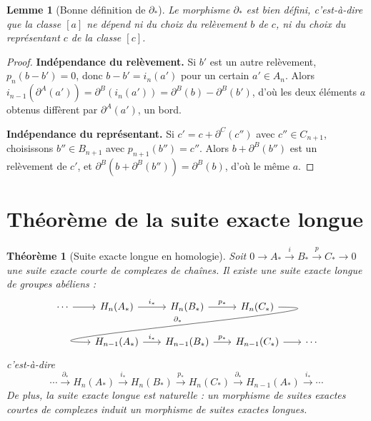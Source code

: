\documentclass[12pt,a4paper,openany]{book}
\theoremstyle{definition}
\theoremstyle{plain}
\newtheorem{theoreme}[definition]{Théorème}
\newtheorem{lemme}[definition]{Lemme}
\theoremstyle{remark}
\begin{document}
\begin{lemme}[Bonne définition de $\partial_*$]\label{lem:connexion-bien-defini}
Le morphisme $\partial_*$ est bien défini, c'est-à-dire que la classe $[a]$ ne dépend ni du
choix du relèvement $b$ de $c$, ni du choix du représentant $c$ de la classe $[c]$.
\end{lemme}

\begin{proof}
\textbf{Indépendance du relèvement.} Si $b'$ est un autre relèvement, $p_n(b - b') = 0$,
donc $b - b' = i_n(a')$ pour un certain $a' \in A_n$. Alors
$i_{n-1}(\partial^A(a')) = \partial^B(i_n(a')) = \partial^B(b) - \partial^B(b')$, d'où
les deux éléments $a$ obtenus diffèrent par $\partial^A(a')$, un bord.

\textbf{Indépendance du représentant.} Si $c' = c + \partial^C(c'')$ avec $c'' \in C_{n+1}$,
choisissons $b'' \in B_{n+1}$ avec $p_{n+1}(b'') = c''$. Alors $b + \partial^B(b'')$ est un
relèvement de $c'$, et $\partial^B(b + \partial^B(b'')) = \partial^B(b)$, d'où le même $a$.
\end{proof}

\section{Théorème de la suite exacte longue}\label{sec:sel-homologie}

\begin{theoreme}[Suite exacte longue en homologie]\label{thm:suite-exacte-longue}
Soit $0 \to A_* \xrightarrow{i} B_* \xrightarrow{p} C_* \to 0$ une suite exacte courte de
complexes de chaînes. Il existe une suite exacte longue de groupes abéliens :
\[
\begin{tikzcd}[column sep=1.8em]
  \cdots \ar[r] & H_n(A_*) \ar[r, "i_*"] & H_n(B_*) \ar[r, "p_*"] & H_n(C_*) \ar[dll, "\partial_*"', out=0, in=180, looseness=1.5, overlay] \\
  & H_{n-1}(A_*) \ar[r, "i_*"] & H_{n-1}(B_*) \ar[r, "p_*"] & H_{n-1}(C_*) \ar[r] & \cdots
\end{tikzcd}
\]
c'est-à-dire
\[
  \cdots \xrightarrow{\partial_*} H_n(A_*) \xrightarrow{i_*} H_n(B_*) \xrightarrow{p_*} H_n(C_*) \xrightarrow{\partial_*} H_{n-1}(A_*) \xrightarrow{i_*} \cdots
\]
De plus, la suite exacte longue est \emph{naturelle} : un morphisme de suites exactes courtes
de complexes induit un morphisme de suites exactes longues.
\end{theoreme}
\end{document}
